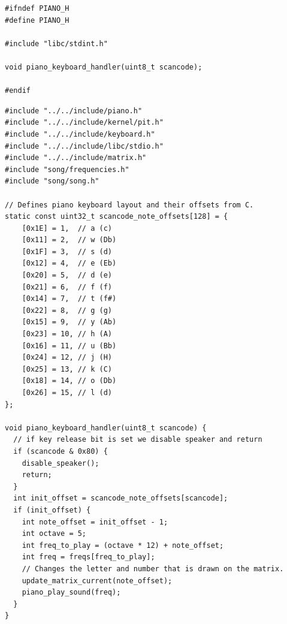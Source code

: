 \documentclass[../main.tex]{subfiles}
\begin{document}
\begin{listing}[H]
    \begin{verbatim}
#ifndef PIANO_H
#define PIANO_H

#include "libc/stdint.h"

void piano_keyboard_handler(uint8_t scancode);

#endif
    \end{verbatim}
    \caption{Implementation of \texttt{piano.h}}
    \label{lst:piano_h}
\end{listing}


\begin{listing}[H]
    \begin{verbatim}
#include "../../include/piano.h"
#include "../../include/kernel/pit.h"
#include "../../include/keyboard.h"
#include "../../include/libc/stdio.h"
#include "../../include/matrix.h"
#include "song/frequencies.h"
#include "song/song.h"

// Defines piano keyboard layout and their offsets from C.
static const uint32_t scancode_note_offsets[128] = {
    [0x1E] = 1,  // a (c)
    [0x11] = 2,  // w (Db)
    [0x1F] = 3,  // s (d)
    [0x12] = 4,  // e (Eb)
    [0x20] = 5,  // d (e)
    [0x21] = 6,  // f (f)
    [0x14] = 7,  // t (f#)
    [0x22] = 8,  // g (g)
    [0x15] = 9,  // y (Ab)
    [0x23] = 10, // h (A)
    [0x16] = 11, // u (Bb)
    [0x24] = 12, // j (H)
    [0x25] = 13, // k (C)
    [0x18] = 14, // o (Db)
    [0x26] = 15, // l (d)
};

void piano_keyboard_handler(uint8_t scancode) {
  // if key release bit is set we disable speaker and return
  if (scancode & 0x80) {
    disable_speaker();
    return;
  }
  int init_offset = scancode_note_offsets[scancode];
  if (init_offset) {
    int note_offset = init_offset - 1;
    int octave = 5;
    int freq_to_play = (octave * 12) + note_offset;
    int freq = freqs[freq_to_play];
    // Changes the letter and number that is drawn on the matrix.
    update_matrix_current(note_offset);
    piano_play_sound(freq);
  }
}
    \end{verbatim}
    \caption{Implementation of \texttt{piano.c}}
    \label{lst:piano_c}
\end{listing}
\end{document}
